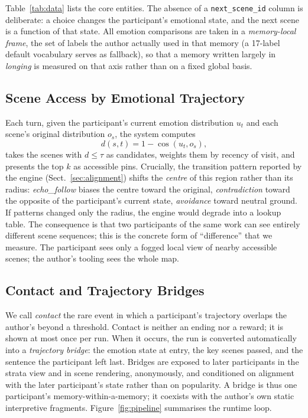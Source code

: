 \documentclass[runningheads]{llncs}
\begin{document}
Table~\ref{tab:data} lists the core entities. The absence of a \texttt{next\_scene\_id} column is deliberate: a choice changes the participant's emotional state, and the next scene is a function of that state. All emotion comparisons are taken in a \emph{memory-local frame}, the set of labels the author actually used in that memory (a 17-label default vocabulary serves as fallback), so that a memory written largely in \emph{longing} is measured on that axis rather than on a fixed global basis.

\subsection{Scene Access by Emotional Trajectory}
\label{sec:access}

Each turn, given the participant's current emotion distribution $u_t$ and each scene's original distribution $o_s$, the system computes
\begin{equation}
d(s,t) = 1 - \cos(u_t, o_s),
\end{equation}
takes the scenes with $d \le \tau$ as candidates, weights them by recency of visit, and presents the top $k$ as accessible pins. Crucially, the transition pattern reported by the engine (Sect.~\ref{sec:alignment}) shifts the \emph{centre} of this region rather than its radius: \emph{echo\_follow} biases the centre toward the original, \emph{contradiction} toward the opposite of the participant's current state, \emph{avoidance} toward neutral ground. If patterns changed only the radius, the engine would degrade into a lookup table. The consequence is that two participants of the same work can see entirely different scene sequences; this is the concrete form of ``difference'' that we measure. The participant sees only a fogged local view of nearby accessible scenes; the author's tooling sees the whole map.

\subsection{Contact and Trajectory Bridges}
\label{sec:bridges}

We call \emph{contact} the rare event in which a participant's trajectory overlaps the author's beyond a threshold. Contact is neither an ending nor a reward; it is shown at most once per run. When it occurs, the run is converted automatically into a \emph{trajectory bridge}: the emotion state at entry, the key scenes passed, and the sentence the participant left last. Bridges are exposed to later participants in the strata view and in scene rendering, anonymously, and conditioned on alignment with the later participant's state rather than on popularity. A bridge is thus one participant's memory-within-a-memory; it coexists with the author's own static interpretive fragments. Figure~\ref{fig:pipeline} summarises the runtime loop.
\end{document}
